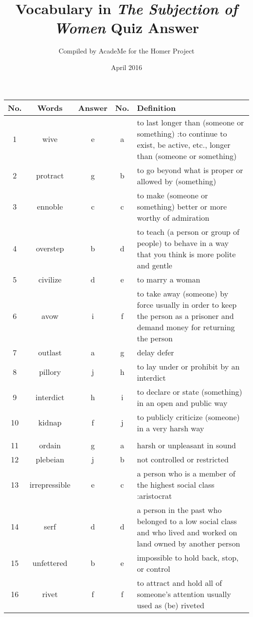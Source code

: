\documentclass[a4paper]{article}
\title{Vocabulary in \textit{The Subjection of Women} Quiz Answer}
\author{Compiled by AcadeMe for the Homer Project}
\date{April 2016}
\begin{document}
\maketitle
\begin{center}
\begin{tabular}{|c|c|c|c|m{}|}
\hline
No. & Words & Answer & No. & Definition \\
\hline
 1  & wive & e & a &  to last longer than (someone or something) :to continue to exist, be active, etc., longer than (someone or something) \\
\hline
 2  & protract & g & b &  to go beyond what is proper or allowed by (something) \\
\hline
 3  & ennoble & c & c &  to make (someone or something) better or more worthy of admiration \\
\hline
 4  & overstep & b & d &  to teach (a person or group of people) to behave in a way that you think is more polite and gentle \\
\hline
 5  & civilize & d & e &  to marry a woman\\
\hline
 6  & avow & i & f &  to take away (someone) by force usually in order to keep the person as a prisoner and demand money for returning the person \\
\hline
 7  & outlast & a & g &  delay defer\\
\hline
 8  & pillory & j & h &  to lay under or prohibit by an interdict\\
\hline
 9  & interdict & h & i &  to declare or state (something) in an open and public way \\
\hline
 10  & kidnap & f & j &  to publicly criticize (someone) in a very harsh way \\
\hline
 & & & & \\
\hline
 11  & ordain & g & a &  harsh or unpleasant in sound \\
\hline
 12  & plebeian & j & b &  not controlled or restricted \\
\hline
 13  & irrepressible & e & c &  a person who is a member of the highest social class :aristocrat\\
\hline
 14  & serf & d & d &  a person in the past who belonged to a low social class and who lived and worked on land owned by another person \\
\hline
 15  & unfettered & b & e &  impossible to hold back, stop, or control \\
\hline
 16  & rivet & f & f &  to attract and hold all of someone's attention usually used as (be) riveted \\

\end{tabular}
\end{center}
\end{document}
